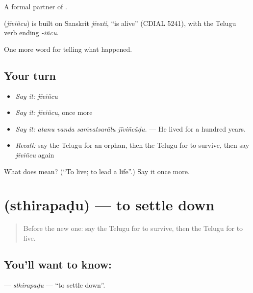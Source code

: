 A formal partner of .

\begin{cousinweb}
\textbf{} (\emph{jīviñcu}) is built on Sanskrit \emph{jīvati}, \textquotedblleft{}is alive\textquotedblright{} (CDIAL 5241), with the Telugu verb ending \emph{-iñcu}.
\end{cousinweb}

\begin{grammarlens}[title={What you've built}]
One more word for telling what happened.
\end{grammarlens}

\subsection*{Your turn}
\begin{itemize}
\raggedright
  \item \emph{Say it:} \emph{jīviñcu}
  \item \emph{Say it:} \emph{jīviñcu}, once more
  \item \emph{Say it:} \emph{atanu vanda saṁvatsarālu jīviñcāḍu.} — He lived for a hundred years.
  \item \emph{Recall:} say the Telugu for an orphan, then the Telugu for to survive, then say \emph{jīviñcu} again
\end{itemize}

\begin{tcolorbox}[breakable,colback=teal!4,colframe=teal!35!black,title={Before you move on}]
What does  mean? (\textquotedblleft{}To live; to lead a life\textquotedblright{}.) Say it once more.
\end{tcolorbox}
\section[\texorpdfstring{\te{స్థిరపడు} (sthirapaḍu)}{స్థిరపడు (sthirapaḍu)}]{ (sthirapaḍu) — to settle down}

\label{lesson:TE-C358-sthirapadu}



\begin{quote}
Before the new one: say the Telugu for to survive, then the Telugu for to live.
\end{quote}

\subsection*{You'll want to know: }
\textbf{} — \emph{sthirapaḍu} — \textquotedblleft{}to settle down\textquotedblright{}.

